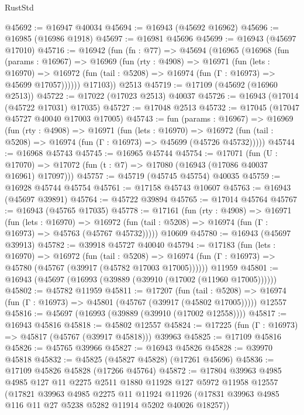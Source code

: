 \begin{lexlean}{RustStd}
\begin{coremodule}
@45692 := @16947 @40034
@45694 := @16943 (@45692 @16962)
@45696 := @16985 (@16986 @1918)
@45697 := @16981 @45696
@45699 := @16943 (@45697 @17010)
@45716 := @16942
    (fun (fn : @77) =>
    @45694
      (@16965
        (@16968
          (fun (params : @16967) =>
          @16969
            (fun (rty : @4908) =>
            @16971
              (fun (lets : @16970) =>
              @16972 (fun (tail : @5208) => @16974 (fun (Γ : @16973) => @45699 @17057))))))
        @17103))
    @2513
@45719 := @17109 (@45692 (@16960 @2513))
@45722 := @17022 (@17023 @2513) @40037
@45726 := @16943 (@17014 (@45722 @17031) @17035)
@45727 := @17048 @2513
@45732 := @17045 (@17047 @45727 @40040 @17003 @17005)
@45743 := fun (params : @16967) =>
  @16969
    (fun (rty : @4908) =>
    @16971
      (fun (lets : @16970) =>
      @16972 (fun (tail : @5208) => @16974 (fun (Γ : @16973) => @45699 (@45726 @45732)))))
@45744 := @16968 @45743
@45745 := @16965 @45744
@45754 := @17071
    (fun (U : @17070) => @17072 (fun (t : @7) => @17080 (@16943 (@17086 @40037 @16961) @17097)))
@45757 := @45719 (@45745 @45754) @40035
@45759 := @16928 @45744 @45754
@45761 := @17158 @45743 @10607
@45763 := @16943 (@45697 @39891)
@45764 := @45722 @39894
@45765 := @17014 @45764
@45767 := @16943 (@45765 @17035)
@45778 := @17161
    (fun (rty : @4908) =>
    @16971
      (fun (lets : @16970) =>
      @16972 (fun (tail : @5208) => @16974 (fun (Γ : @16973) => @45763 (@45767 @45732)))))
    @10609
@45780 := @16943 (@45697 @39913)
@45782 := @39918 @45727 @40040
@45794 := @17183
    (fun (lets : @16970) =>
    @16972
      (fun (tail : @5208) =>
      @16974 (fun (Γ : @16973) => @45780 (@45767 (@39917 (@45782 @17003 @17005))))))
    @11959
@45801 := @16943 (@45697 (@16993 (@39889 (@39910 (@17002 (@11960 @17005))))))
@45802 := @45782 @11959
@45811 := @17207
    (fun (tail : @5208) => @16974 (fun (Γ : @16973) => @45801 (@45767 (@39917 (@45802 @17005)))))
    @12557
@45816 := @45697 (@16993 (@39889 (@39910 (@17002 @12558))))
@45817 := @16943 @45816
@45818 := @45802 @12557
@45824 := @17225 (fun (Γ : @16973) => @45817 (@45767 (@39917 @45818))) @39963
@45825 := @17109 @45816
@45826 := @45765 @39966
@45827 := @16943 @45826
@45828 := @39970 @45818
@45832 := @45825 (@45827 @45828) (@17261 @45696)
@45836 := @17109 @45826 @45828 (@17266 @45764)
@45872 := @17804
    @39963
    @4985
    @4985
    @127
    @11
    @2275
    @2511
    @1880
    @11928
    @127
    @5972
    @11958
    @12557
    (@17821
      @39963
      @4985
      @2275
      @11
      @11924
      @11926
      (@17831 @39963 @4985 @116 @11 @27 @5238 @5282 @11914 @5202 @40026 @18257))

\end{coremodule}
\end{lexlean}
